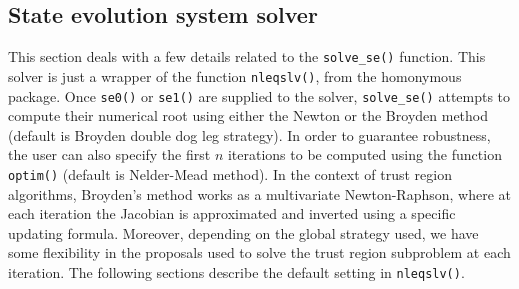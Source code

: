 \documentclass{article}
\begin{document}
\subsection{State evolution system solver}
This section deals with a few details related to the \texttt{solve\_se()} function. This solver is just a wrapper of the function \texttt{nleqslv()}, from the homonymous package. Once \texttt{se0()} or \texttt{se1()} are supplied to the solver, \texttt{solve\_se()} attempts to compute their numerical root using either the Newton or the Broyden method (default is Broyden double dog leg strategy). In order to guarantee robustness, the user can also specify the first $n$ iterations to be computed using the function \texttt{optim()} (default is Nelder-Mead method). In the context of trust region algorithms, Broyden's method works as a multivariate Newton-Raphson, where at each iteration the Jacobian is approximated and inverted using a specific updating formula. Moreover, depending on the global strategy used, we have some flexibility in the proposals used to solve the trust region subproblem at each iteration. The following sections describe the default setting in \texttt{nleqslv()}. 
\end{document}
